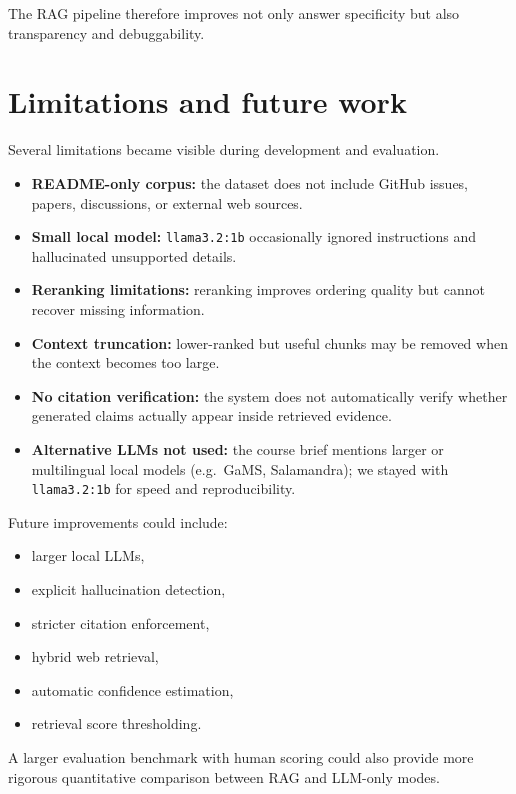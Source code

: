\documentclass[11pt,a4paper]{article}
\begin{document}
The RAG pipeline therefore improves not only answer specificity but also transparency and debuggability.

\section{Limitations and future work}
Several limitations became visible during development and evaluation.

\begin{itemize}
  \item \textbf{README-only corpus:} the dataset does not include GitHub issues, papers, discussions, or external web sources.

  \item \textbf{Small local model:} \texttt{llama3.2:1b} occasionally ignored instructions and hallucinated unsupported details.

  \item \textbf{Reranking limitations:} reranking improves ordering quality but cannot recover missing information.

  \item \textbf{Context truncation:} lower-ranked but useful chunks may be removed when the context becomes too large.

  \item \textbf{No citation verification:} the system does not automatically verify whether generated claims actually appear inside retrieved evidence.

  \item \textbf{Alternative LLMs not used:} the course brief mentions larger or multilingual local models (e.g.\ GaMS, Salamandra); we stayed with \texttt{llama3.2:1b} for speed and reproducibility.
\end{itemize}

Future improvements could include:

\begin{itemize}
  \item larger local LLMs,
  \item explicit hallucination detection,
  \item stricter citation enforcement,
  \item hybrid web retrieval,
  \item automatic confidence estimation,
  \item retrieval score thresholding.
\end{itemize}

A larger evaluation benchmark with human scoring could also provide more rigorous quantitative comparison between RAG and LLM-only modes.
\end{document}
